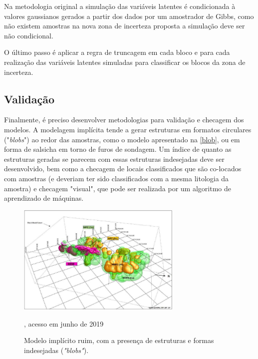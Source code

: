 Na metodologia original \cite{armstrong2011plurigaussian} a simulação das variáveis latentes é condicionada à valores gaussianos gerados a partir dos dados por um amostrador de Gibbs, como não existem amostras na nova zona de incerteza proposta a simulação deve ser não condicional.

O último passo é aplicar a regra de truncagem em cada bloco e para cada realização das variáveis latentes simuladas para classificar os blocos da zona de incerteza.

\subsection{Validação}

Finalmente, é preciso desenvolver metodologias para validação e checagem dos modelos. A modelagem implícita tende a gerar estruturas em formatos circulares ("\textit{blobs}") ao redor das amostras, como o modelo apresentado na \autoref{blob}, ou em forma de salsicha em torno de furos de sondagem. Um índice de quanto as estruturas geradas se parecem com essas estruturas indesejadas deve ser desenvolvido, bem como a checagem de locais classificados que são co-locados com amostras (e deveriam ter sido classificados com a mesma litologia da amostra) e checagem "visual", que pode ser realizada por um algoritmo de aprendizado de máquinas.

\begin{figure}[H]
	\caption{\label{blob}Modelo implícito ruim, com a presença de estruturas e formas indesejadas (\textit{"blobs"}).}
	\begin{center}
		\includegraphics[width=0.7\textwidth]{capitulo_3/blob.jpg}
	\end{center}
	, acesso em junho de 2019
\end{figure}

